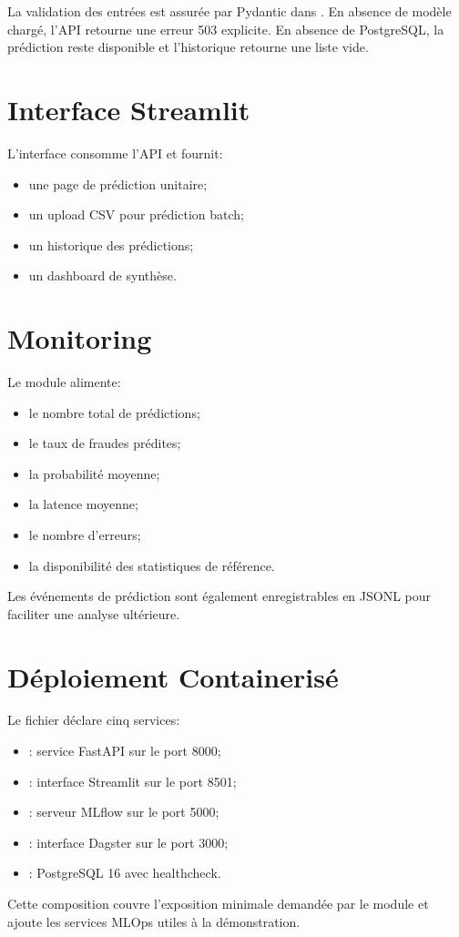 La validation des entrées est assurée par Pydantic dans . En absence de modèle chargé, l'API retourne une erreur 503 explicite. En absence de PostgreSQL, la prédiction reste disponible et l'historique retourne une liste vide.

\section{Interface Streamlit}

L'interface  consomme l'API et fournit:

\begin{itemize}
    \item une page de prédiction unitaire;
    \item un upload CSV pour prédiction batch;
    \item un historique des prédictions;
    \item un dashboard de synthèse.
\end{itemize}

\section{Monitoring}

Le module  alimente:

\begin{itemize}
    \item le nombre total de prédictions;
    \item le taux de fraudes prédites;
    \item la probabilité moyenne;
    \item la latence moyenne;
    \item le nombre d'erreurs;
    \item la disponibilité des statistiques de référence.
\end{itemize}

Les événements de prédiction sont également enregistrables en JSONL pour faciliter une analyse ultérieure.

\section{Déploiement Containerisé}

Le fichier  déclare cinq services:

\begin{itemize}
    \item {}: service FastAPI sur le port 8000;
    \item {}: interface Streamlit sur le port 8501;
    \item {}: serveur MLflow sur le port 5000;
    \item {}: interface Dagster sur le port 3000;
    \item {}: PostgreSQL 16 avec healthcheck.
\end{itemize}

Cette composition couvre l'exposition minimale demandée par le module et ajoute les services MLOps utiles à la démonstration.
